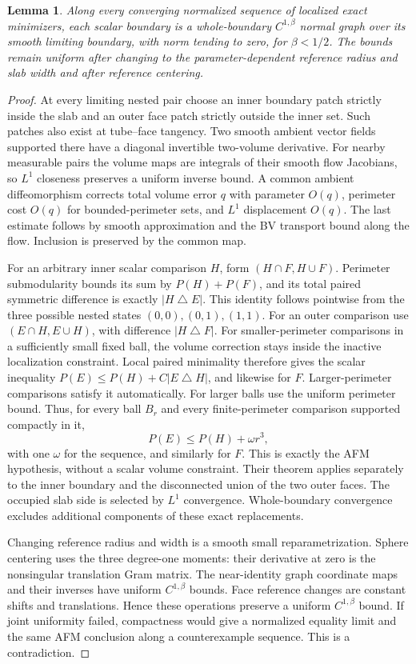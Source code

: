 \documentclass[11pt]{article}
\newtheorem{lemma}[theorem]{Lemma}
\theoremstyle{remark}\newtheorem{remark}[theorem]{Remark}
\numberwithin{equation}{section}
\begin{document}
\begin{lemma}\label{lem:graphs}
Along every converging normalized sequence of localized exact minimizers,
each scalar boundary is a whole-boundary $C^{1,\beta}$ normal graph over
its smooth limiting boundary, with norm tending to zero, for $\beta<1/2$.
The bounds remain uniform after changing to the parameter-dependent
reference radius and slab width and after reference centering.
\end{lemma}
\begin{proof}
At every limiting nested pair choose an inner boundary patch strictly
inside the slab and an outer face patch strictly outside the inner set.
Such patches also exist at tube--face tangency. Two smooth ambient vector
fields supported there have a diagonal invertible two-volume derivative.
For nearby measurable pairs the volume maps are integrals of their smooth
flow Jacobians, so $L^1$ closeness preserves a uniform inverse bound.
A common ambient diffeomorphism corrects total volume error $q$ with
parameter $O(q)$, perimeter cost $O(q)$ for bounded-perimeter sets,
and $L^1$ displacement $O(q)$. The last estimate follows by smooth
approximation and the BV transport bound along the flow. Inclusion is
preserved by the common map.

For an arbitrary inner scalar comparison $H$, form
$(H\cap F,H\cup F)$. Perimeter submodularity bounds its sum by
$P(H)+P(F)$, and its total paired symmetric difference is exactly
$|H\mathbin\triangle E|$. This identity follows pointwise from the
three possible nested states $(0,0),(0,1),(1,1)$. For an outer comparison
use $(E\cap H,E\cup H)$, with difference $|H\mathbin\triangle F|$.
For smaller-perimeter comparisons in a sufficiently small fixed ball,
the volume correction stays inside the inactive localization constraint.
Local paired minimality therefore gives the scalar inequality
$P(E)\leq P(H)+C|E\mathbin\triangle H|$, and likewise for $F$.
Larger-perimeter comparisons satisfy it automatically. For larger balls
use the uniform perimeter bound. Thus, for every ball $B_r$ and every
finite-perimeter comparison supported compactly in it,
\[
 P(E)\leq P(H)+\omega r^3,
\]
with one $\omega$ for the sequence, and similarly for $F$.
This is exactly the AFM hypothesis, without a scalar volume constraint.
Their theorem applies separately to the inner boundary and the disconnected
union of the two outer faces. The occupied slab side is selected by
$L^1$ convergence. Whole-boundary convergence excludes additional components
of these exact replacements.

Changing reference radius and width is a smooth small reparametrization.
Sphere centering uses the three degree-one moments: their derivative at
zero is the nonsingular translation Gram matrix. The near-identity graph
coordinate maps and their inverses have uniform $C^{1,\beta}$ bounds.
Face reference changes are constant shifts and translations. Hence these
operations preserve a uniform $C^{1,\beta}$ bound. If joint uniformity
failed, compactness would give a normalized equality limit and the same
AFM conclusion along a counterexample sequence. This is a contradiction.
\end{proof}
\end{document}

